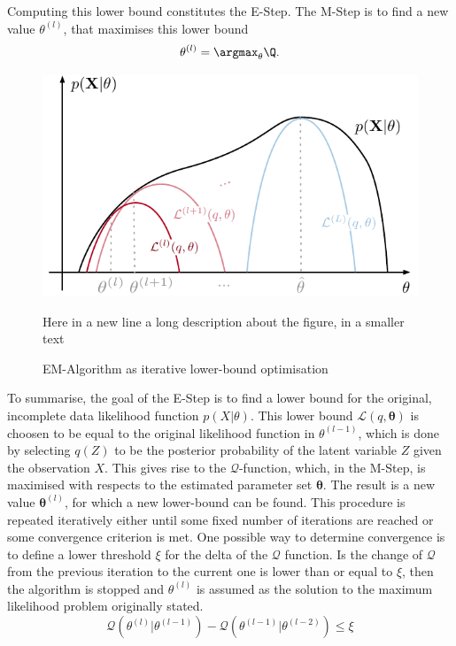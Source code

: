 Computing this lower bound constitutes the E-Step. The M-Step is to find a new value $\theta^{(l)}$, that maximises this lower bound
\begin{equation}
\label{eq:m-step}
    \theta^{(l)} = \argmax_{\theta}\Q.
\end{equation}

\begin{figure}[!hb]
\label{fig:em}
    \centering
    \includegraphics[scale=1]{data/figures/em-Q4}
    \caption[Short Title for EM-Algorithm]{EM-Algorithm as iterative lower-bound optimisation}
    \medskip
    \small
    Here in a new line a long description about the figure, in a smaller text
\end{figure}

To summarise, the goal of the E-Step is to find a lower bound for the original, incomplete data likelihood function $p(X\vert\theta)$. This lower bound $\mathcal{L}(q,\bm\theta)$ is choosen to be equal to the original likelihood function in $\theta^{(l-1)}$, which is done by selecting $q(Z)$ to be the posterior probability of the latent variable $Z$ given the observation $X$. This gives rise to the $\mathcal{Q}$-function, which, in the M-Step, is maximised with respects to the estimated parameter set $\bm\theta$. The result is a new value $\bm\theta^{(l)}$, for which a new lower-bound can be found. This procedure is repeated iteratively either until some fixed number of iterations are reached or some convergence criterion is met. One possible way to determine convergence is to define a lower threshold $\xi$ for the delta of the $\mathcal{Q}$ function. Is the change of $\mathcal{Q}$ from the previous iteration to the current one is lower than or equal to $\xi$, then the algorithm is stopped and $\theta^{(l)}$ is assumed as the solution to the maximum likelihood problem originally stated.
\begin{equation}
    \mathcal{Q}(\theta^{(l)}\vert\theta^{(l-1)})-\mathcal{Q}(\theta^{(l-1)}\vert\theta^{(l-2)})\leq\xi
    \label{eq:convergence-check}
\end{equation}

